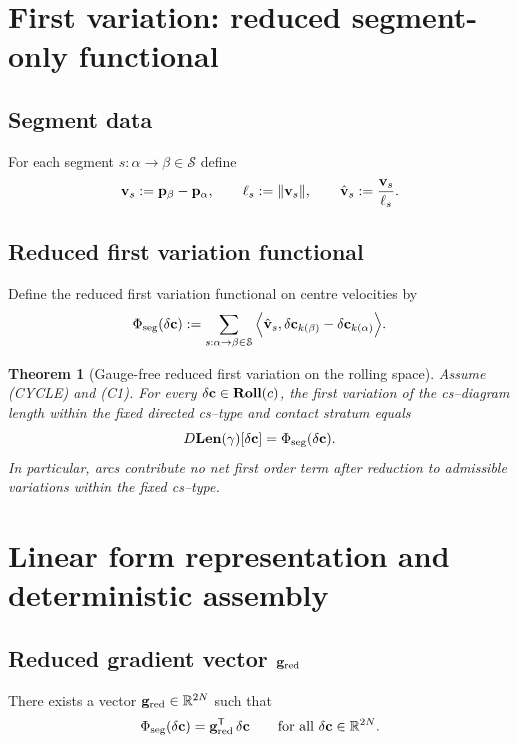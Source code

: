\documentclass[12pt,letterpaper]{amsart}
\newtheorem{theorem}{Theorem}[section]
\theoremstyle{definition}
\theoremstyle{remark}
\newcommand{\Roll}{\text{\rm \bf Roll}}
\newcommand{\Len}{\text{\rm \bf Len}}
\newcommand{\R}{{\mathbb{R}}}
\begin{document}
\section{First variation: reduced segment-only functional}

\subsection{Segment data}

For each segment $s:\alpha\to\beta\in\mathcal S$ define
\[
{\bf v}_s:={\bf p}_\beta-{\bf p}_\alpha,\qquad \ell_s:=\|{\bf v}_s\|,\qquad \hat{\bf v}_s:=\frac{{\bf v}_s}{\ell_s}.
\]

\subsection{Reduced first variation functional}

Define the reduced first variation functional on centre velocities by
\[
\Phi_{\rm seg}(\delta{\bf c}):=\sum_{s:\alpha\to\beta\in\mathcal S}\Big\langle \hat{\bf v}_s,\delta{\bf c}_{k(\beta)}-\delta{\bf c}_{k(\alpha)}\Big\rangle.
\]

\begin{theorem}[Gauge-free reduced first variation on the rolling space]
Assume (CYCLE) and (C1). For every $\delta{\bf c}\in\Roll(c)$, the first variation of the cs--diagram length within the fixed directed cs--type and contact stratum equals
\[
D\Len(\gamma)[\delta{\bf c}]=\Phi_{\rm seg}(\delta{\bf c}).
\]
In particular, arcs contribute no net first order term after reduction to admissible variations within the fixed cs--type.
\end{theorem}

\section{Linear form representation and deterministic assembly}

\subsection{Reduced gradient vector ${\bf g}_{\rm red}$}

There exists a vector ${\bf g}_{\rm red}\in\R^{2N}$ such that
\[
\Phi_{\rm seg}(\delta{\bf c})={\bf g}_{\rm red}^\mathsf T\,\delta{\bf c}
\qquad
\text{for all }\delta{\bf c}\in\R^{2N}.
\]
\end{document}

